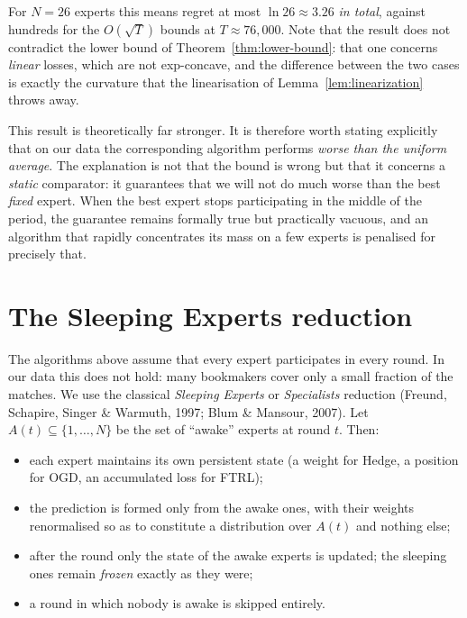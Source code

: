 \documentclass[12pt,a4paper,oneside]{report}
\renewcommand{\_}{\oldunderscore\allowbreak}
\theoremstyle{definition}
\theoremstyle{plain}
\theoremstyle{remark}
\begin{document}
For $N=26$ experts this means regret at most $\ln 26 \approx 3.26$ \emph{in total}, against
hundreds for the $O(\sqrt{T})$ bounds at $T\approx 76{,}000$. Note that the result does not
contradict the lower bound of Theorem~\ref{thm:lower-bound}: that one concerns \emph{linear}
losses, which are not exp-concave, and the difference between the two cases is exactly the
curvature that the linearisation of Lemma~\ref{lem:linearization} throws away.

This result is theoretically far stronger. It is therefore worth stating explicitly that on our
data the corresponding algorithm performs \emph{worse than the uniform average}. The
explanation is not that the bound is wrong but that it concerns a \emph{static} comparator: it
guarantees that we will not do much worse than the best \emph{fixed} expert. When the best
expert stops participating in the middle of the period, the guarantee remains formally true but
practically vacuous, and an algorithm that rapidly concentrates its mass on a few experts is
penalised for precisely that.

\section{The Sleeping Experts reduction}
\label{sec:sleeping}

The algorithms above assume that every expert participates in every round. In our data this
does not hold: many bookmakers cover only a small fraction of the matches. We use the classical
\emph{Sleeping Experts} or \emph{Specialists} reduction (Freund, Schapire, Singer \& Warmuth,
1997; Blum \& Mansour, 2007). Let $A(t) \subseteq \{1,\dots,N\}$ be the set of ``awake''
experts at round $t$. Then:

\begin{itemize}
  \item each expert maintains its own persistent state (a weight for Hedge, a position for OGD,
        an accumulated loss for FTRL);
  \item the prediction is formed only from the awake ones, with their weights renormalised so
        as to constitute a distribution over $A(t)$ and nothing else;
  \item after the round only the state of the awake experts is updated; the sleeping ones
        remain \emph{frozen} exactly as they were;
  \item a round in which nobody is awake is skipped entirely.
\end{itemize}
\end{document}

